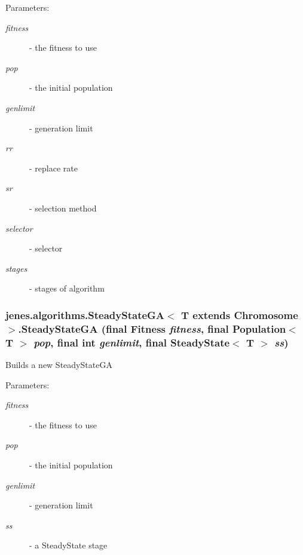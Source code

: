 \begin{Desc}
\item[Parameters:]
\begin{description}
\item[{\em fitness}]- the fitness to use \item[{\em pop}]- the initial population \item[{\em genlimit}]- generation limit \item[{\em rr}]- replace rate \item[{\em sr}]- selection method \item[{\em selector}]- selector \item[{\em stages}]- stages of algorithm \end{description}
\end{Desc}
\hypertarget{classjenes_1_1algorithms_1_1_steady_state_g_a_3_01_t_01extends_01_chromosome_01_4_8e1b8939ca23670640b050dae1e239cc}{
\subsubsection[SteadyStateGA]{\setlength{\rightskip}{0pt plus 5cm}jenes.algorithms.SteadyStateGA$<$ T extends Chromosome $>$.SteadyStateGA (final Fitness {\em fitness}, \/  final Population$<$ T $>$ {\em pop}, \/  final int {\em genlimit}, \/  final SteadyState$<$ T $>$ {\em ss})}}
\label{classjenes_1_1algorithms_1_1_steady_state_g_a_3_01_t_01extends_01_chromosome_01_4_8e1b8939ca23670640b050dae1e239cc}


Builds a new SteadyStateGA

\begin{Desc}
\item[Parameters:]
\begin{description}
\item[{\em fitness}]- the fitness to use \item[{\em pop}]- the initial population \item[{\em genlimit}]- generation limit \item[{\em ss}]- a SteadyState stage \end{description}
\end{Desc}


